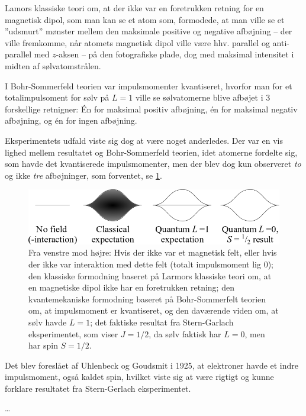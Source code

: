 Lamors klassiske teori om, at der ikke var en foretrukken retning for en magnetisk dipol, som man kan se et atom som, formodede, at man ville se et ''udsmurt'' mønster mellem den maksimale positive og negative afbøjning -- der ville fremkomme, når atomets magnetisk dipol ville være hhv. parallel og anti-parallel med $z$-aksen -- på den fotografiske plade, dog med maksimal intensitet i midten af sølvatomstrålen.

I Bohr-Sommerfeld teorien var impulsmomenter kvantiseret, hvorfor man for et totalimpulsoment for sølv på $L = 1$ ville se sølvatomerne blive afbøjet i 3 forskellige retnigner: Én for maksimal positiv afbøjning, én for maksimal negativ afbøjning, og én for ingen afbøjning.

Eksperimentets udfald viste sig dog at være noget anderledes. Der var en vis lighed mellem resultatet og Bohr-Sommerfeld teorien, idet atomerne fordelte sig, som havde det kvantiserede impulsmomenter, men der blev dog kun observeret \emph{to} og ikke \emph{tre} afbøjninger, som forventet, se \cref{fig:Q08_SternGarlachExperimentResult}.

\begin{figure}[!h]
    \centering
    \includegraphics[width=\textwidth]{Q08/images/SternGerlachExperimentResult.png}
    \caption{Fra venstre mod højre: Hvis der ikke var et magnetisk felt, eller hvis der ikke var interaktion med dette felt (totalt impulsmoment lig $0$); den klassiske formodning baseret på Larmors klassiske teori om, at en magnetiske dipol ikke har en foretrukken retning; den kvantemekaniske formodning baseret på Bohr-Sommerfelt teorien om, at impulsmoment er kvantiseret, og den daværende viden om, at sølv havde $L = 1$; det faktiske resultat fra Stern-Garlach eksperimentet, som viser $J = 1/2$, da sølv faktisk har $L = 0$, men har spin $S = 1/2$.}
    \label{fig:Q08_SternGarlachExperimentResult}
\end{figure}

Det blev foreslået af Uhlenbeck og Goudsmit i 1925, at elektroner havde et indre impulsmoment, også kaldet spin, hvilket viste sig at være rigtigt og kunne forklare resultatet fra Stern-Gerlach eksperimentet.

\ldots


